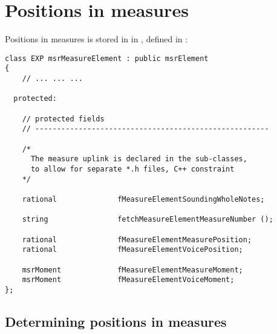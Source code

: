 

\chapter{Positions in measures}

Positions in measures is stored in  in , defined in :
\begin{lstlisting}[language=CPlusPlus]
class EXP msrMeasureElement : public msrElement
{
	// ... ... ...

  protected:

    // protected fields
    // ------------------------------------------------------

    /*
      The measure uplink is declared in the sub-classes,
      to allow for separate *.h files, C++ constraint
    */

    rational              fMeasureElementSoundingWholeNotes;

    string                fetchMeasureElementMeasureNumber ();

    rational              fMeasureElementMeasurePosition;
    rational              fMeasureElementVoicePosition;

    msrMoment             fMeasureElementMeasureMoment;
    msrMoment             fMeasureElementVoiceMoment;
};
\end{lstlisting}

\section{Determining positions in measures}

